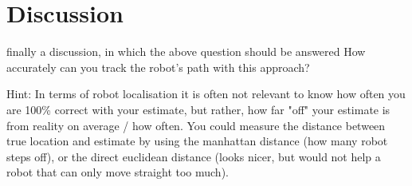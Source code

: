 \documentclass{article}
\begin{document}
\section{Discussion}
finally a discussion, in which the above question should be answered
How accurately can you track the robot’s path with this approach?

Hint: In terms of robot localisation it is often not relevant to know how often you are 100\% correct with your estimate, but rather, how far "off" your estimate is from reality on average / how often. You could measure the distance between true location and estimate by using the manhattan distance (how many robot steps off), or the direct euclidean distance (looks nicer, but would not help a robot that can only move straight too much). 





\end{document}
